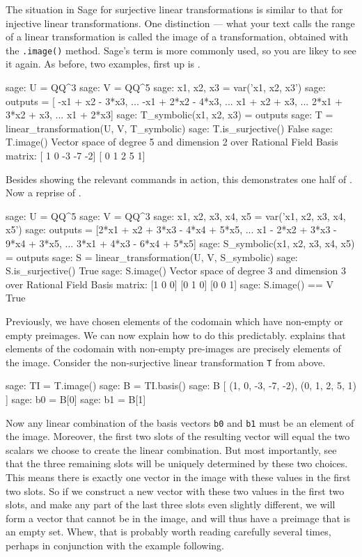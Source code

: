 The situation in Sage for surjective linear transformations is similar to that for injective linear transformations.  One distinction --- what your text calls the range of a linear transformation is called the image of a transformation, obtained with the \verb?.image()? method.  Sage's term is more commonly used, so you are likey to see it again.  As before, two examples, first up is .
%
\begin{sageexample}
sage: U = QQ^3
sage: V = QQ^5
sage: x1, x2, x3 = var('x1, x2, x3')
sage: outputs = [ -x1 +   x2 - 3*x3,
...               -x1 + 2*x2 - 4*x3,
...                x1 +   x2 +   x3,
...              2*x1 + 3*x2 +   x3,
...                x1        + 2*x3]
sage: T_symbolic(x1, x2, x3) = outputs
sage: T = linear_transformation(U, V, T_symbolic)
sage: T.is_surjective()
False
sage: T.image()
Vector space of degree 5 and dimension 2 over Rational Field
Basis matrix:
[ 1  0 -3 -7 -2]
[ 0  1  2  5  1]
\end{sageexample}
%
Besides showing the relevant commands in action, this demonstrates one half of .  Now a reprise of .
%
\begin{sageexample}
sage: U = QQ^5
sage: V = QQ^3
sage: x1, x2, x3, x4, x5 = var('x1, x2, x3, x4, x5')
sage: outputs = [2*x1 +   x2 + 3*x3 - 4*x4 + 5*x5,
...                x1 - 2*x2 + 3*x3 - 9*x4 + 3*x5,
...              3*x1        + 4*x3 - 6*x4 + 5*x5]
sage: S_symbolic(x1, x2, x3, x4, x5) = outputs
sage: S = linear_transformation(U, V, S_symbolic)
sage: S.is_surjective()
True
sage: S.image()
Vector space of degree 3 and dimension 3 over Rational Field
Basis matrix:
[1 0 0]
[0 1 0]
[0 0 1]
sage: S.image() == V
True
\end{sageexample}
%
Previously, we have chosen elements of the codomain which have non-empty or empty preimages.  We can now explain how to do this predictably.   explains that elements of the codomain with non-empty pre-images are precisely elements of the image.  Consider the non-surjective linear transformation \verb?T? from above.
%
\begin{sageexample}
sage: TI = T.image()
sage: B = TI.basis()
sage: B
[
(1, 0, -3, -7, -2),
(0, 1, 2, 5, 1)
]
sage: b0 = B[0]
sage: b1 = B[1]
\end{sageexample}
%
Now any linear combination of the basis vectors \verb?b0? and \verb?b1? must be an element of the image.  Moreover, the first two slots of the resulting vector will equal the two scalars we choose to create the linear combination.  But most importantly, see that the three remaining slots will be uniquely determined by these two choices.  This means there is exactly one vector in the image with these values in the first two slots.  So if we construct a new vector with these two values in the first two slots, and make any part of the last three slots even slightly different, we will form a vector that cannot be in the image, and will thus have a preimage that is an empty set.  Whew, that is probably worth reading carefully several times, perhaps in conjunction with the example following.
